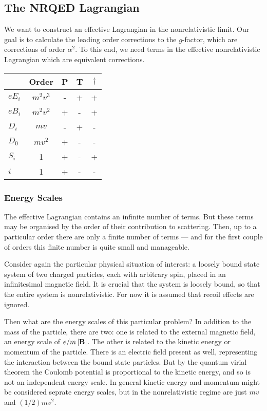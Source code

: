 \subsection{The NRQED Lagrangian}





We want to construct an effective Lagrangian in the nonrelativistic limit.  Our goal is to calculate the leading order corrections to the $g$-factor, which are corrections of order $\alpha^2$.  To this end, we need terms in the effective nonrelativistic Lagrangian which are equivalent corrections.

\begin{tabular}{l|c|ccc}
& Order	&	P	&	T	&	$\dagger$	\\
\hline
$eE_i$	&$m^2v^3$	&	-	& 	+	&	+		\\
$eB_i$	&$m^2v^2$	&	+	&   -	&	+		\\
$D_i$		& $mv$	&	-	&	+	&	-		\\
$D_0$		& $mv^2$	&	+	&	-	&	-		\\
$S_i$		& 1		&	+	&	-	&	+		\\
$i$		& 1		&	+	&	-	&	-		\\
\end{tabular}


\subsubsection{Energy Scales}

The effective Lagrangian contains an infinite number of terms.  But these terms may be organised by the order of their contribution to scattering.  Then, up to a particular order there are only a finite number of terms --- and for the first couple of orders this finite number is quite small and manageable.

Consider again the particular physical situation of interest: a loosely bound state system of two charged particles, each with arbitrary spin, placed in an infinitesimal magnetic field.  It is crucial that the system is loosely bound, so that the entire system is nonrelativistic.  For now it is assumed that recoil effects are ignored.  

Then what are the energy scales of this particular problem?  In addition to the mass of the particle, there are two: one is related to the external magnetic field, an energy scale of $ e/m \left| \mathbf{B} \right|$.  The other is related to the kinetic energy or momentum of the particle.  There is an electric field present as well, representing the interaction between the bound state particles.  But by the quantum virial theorem the Coulomb potential is proportional to the kinetic energy, and so is not an independent energy scale.  In general kinetic energy and momentum might be considered seprate energy scales, but in the nonrelativistic regime are just $mv$ and $(1/2) mv^2$.

